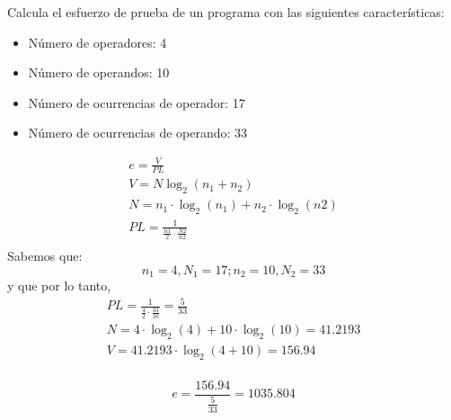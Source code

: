 
\begin{enunciado}
    Calcula el esfuerzo de prueba de un programa con las siguientes características:

    \begin{itemize}
        \item Número de operadores: 4
        \item Número de operandos: 10
        \item Número de ocurrencias de operador: 17
        \item Número de ocurrencias de operando: 33
    \end{itemize}
\end{enunciado}

\begin{gather*}
    e = \frac{V}{PL}\\
    V = N\log_2(n_1+n_2)\\
    N =  n_1\cdot\log_2(n_1) + n_2\cdot\log_2(n2)\\
    PL = \frac{1}{\frac{n1}{2} \cdot \frac{N2}{n2}}\\
\end{gather*}
Sabemos que:
\[n_1 = 4,N_1=17 ;n_2=10,N_2=33\]
y que por lo tanto,
\begin{gather*}
    PL = \frac{1}{\frac{4}{2}\cdot\frac{33}{10}}=\frac{5}{33}\\
    N=4\cdot\log_2(4)+10\cdot\log_2(10) = 41.2193\\
    V = 41.2193 \cdot\log_2(4+10)=156.94\\
\end{gather*}

\begin{solucion}
    \[e = \frac{156.94}{\frac{5}{33}} = 1035.804\]
\end{solucion}